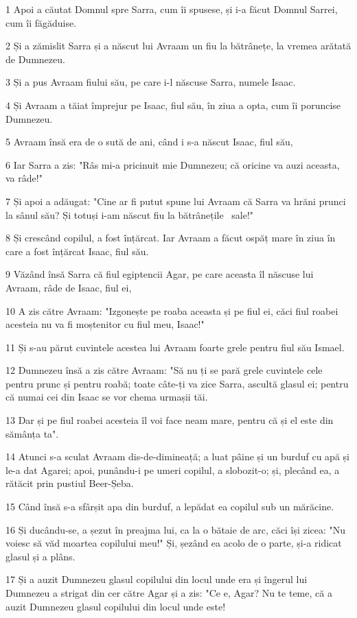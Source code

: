 \par 1 Apoi a căutat Domnul spre Sarra, cum îi spusese, și i-a făcut Domnul Sarrei, cum îi făgăduise.
\par 2 Și a zămislit Sarra și a născut lui Avraam un fiu la bătrânețe, la vremea arătată de Dumnezeu.
\par 3 Și a pus Avraam fiului său, pe care i-l născuse Sarra, numele Isaac.
\par 4 Și Avraam a tăiat împrejur pe Isaac, fiul său, în ziua a opta, cum îi poruncise Dumnezeu.
\par 5 Avraam însă era de o sută de ani, când i s-a născut Isaac, fiul său,
\par 6 Iar Sarra a zis: "Râs mi-a pricinuit mie Dumnezeu; că oricine va auzi aceasta, va râde!"
\par 7 Și apoi a adăugat: "Cine ar fi putut spune lui Avraam că Sarra va hrăni prunci la sânul său? Și totuși i-am născut fiu la bătrânețile  sale!"
\par 8 Și crescând copilul, a fost înțărcat. Iar Avraam a făcut ospăț mare în ziua în care a fost înțărcat Isaac, fiul său.
\par 9 Văzând însă Sarra că fiul egiptencii Agar, pe care aceasta îl născuse lui Avraam, râde de Isaac, fiul ei,
\par 10 A zis către Avraam: "Izgonește pe roaba aceasta și pe fiul ei, căci fiul roabei acesteia nu va fi moștenitor cu fiul meu, Isaac!"
\par 11 Și s-au părut cuvintele acestea lui Avraam foarte grele pentru fiul său Ismael.
\par 12 Dumnezeu însă a zis către Avraam: "Să nu ți se pară grele cuvintele cele pentru prunc și pentru roabă; toate câte-ți va zice Sarra, ascultă glasul ei; pentru că numai cei din Isaac se vor chema urmașii tăi.
\par 13 Dar și pe fiul roabei acesteia îl voi face neam mare, pentru că și el este din sămânța ta".
\par 14 Atunci s-a sculat Avraam dis-de-dimineață; a luat pâine și un burduf cu apă și le-a dat Agarei; apoi, punându-i pe umeri copilul, a slobozit-o; și, plecând ea, a rătăcit prin pustiul Beer-Șeba.
\par 15 Când însă s-a sfârșit apa din burduf, a lepădat ea copilul sub un mărăcine.
\par 16 Și ducându-se, a șezut în preajma lui, ca la o bătaie de arc, căci își zicea: "Nu voiesc să văd moartea copilului meu!" Și, șezând ea acolo de o parte, și-a ridicat glasul și a plâns.
\par 17 Și a auzit Dumnezeu glasul copilului din locul unde era și îngerul lui Dumnezeu a strigat din cer către Agar și a zis: "Ce e, Agar? Nu te teme, că a auzit Dumnezeu glasul copilului din locul unde este!
